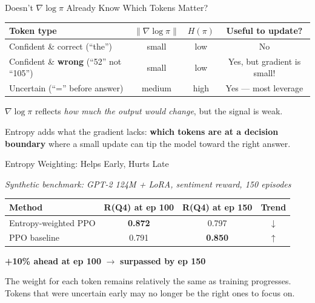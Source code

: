 \documentclass[aspectratio=169,10pt]{beamer}
\begin{document}
\begin{frame}{Doesn't $\nabla\log\pi$ Already Know Which Tokens Matter?}

\begin{center}
\begin{tabular}{lccc}
\toprule
Token type & $\|\nabla\log\pi\|$ & $H(\pi)$ & Useful to update? \\
\midrule
Confident \& correct (``the'') & small & low & No \\
Confident \& \textbf{wrong} (``52'' not ``105'') & small & low & Yes, but gradient is small! \\
\alert{Uncertain (``='' before answer)} & medium & \alert{high} & \alert{Yes --- most leverage} \\
\bottomrule
\end{tabular}
\end{center}

\vspace{0.3cm}
$\nabla\log\pi$ reflects \textit{how much the output would change}, but the signal is weak.

\vspace{0.3cm}
Entropy adds what the gradient lacks: \textbf{which tokens are at a decision boundary} where a small update can tip the model toward the right answer.

\end{frame}

\begin{frame}{Entropy Weighting: Helps Early, Hurts Late}

\textit{\scriptsize Synthetic benchmark: GPT-2 124M + LoRA, sentiment reward, 150 episodes}

\begin{table}
\begin{tabular}{lccc}
\toprule
Method & R(Q4) at ep 100 & R(Q4) at ep 150 & Trend \\
\midrule
Entropy-weighted PPO & \textbf{0.872} & 0.797 & \textcolor{bad}{$\downarrow$} \\
PPO baseline & 0.791 & \textbf{0.850} & \textcolor{good}{$\uparrow$} \\
\bottomrule
\end{tabular}
\end{table}

\vspace{0.3cm}
\textbf{+10\% ahead at ep 100} $\longrightarrow$ \textbf{surpassed by ep 150}

\vspace{0.3cm}
The weight for each token remains relatively the same as training progresses. Tokens that were uncertain early may no longer be the right ones to focus on.

\end{frame}
\end{document}

